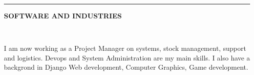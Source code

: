 \documentclass[10pt,A4]{article}
\newcommand{\cvsection}[2] {
\textcolor{titletext}{\uppercase{\textbf{#1}}}
}
\newcommand{\cvsect}[4]{
	\textcolor{#3}{\hrule}
	\colorbox{#3}{ {\cvsection{#1}{#4}}}
}
\begin{document}
\begin{minipage}{0.59\textwidth}
	
	
	
	
	
	
	

	\cvsect{Software and Industries}{0.49}{thirdcol}{textcol}\\[-15pt]
	\begin{center}
	\mbox{
		}
	\vspace{5pt}
	\hspace{10pt}
	\parbox[b][50pt][c]{0.9\textwidth}{
		\begin{center}
		\textcolor{textcol}{\newline \newline \newline {} \hspace{1pt} I am now working as a Project Manager on systems, stock management, support and logistics.\newline \faTerminal \hspace{1pt} Devops and System Administration are my main skills.\newline {} \hspace{1pt} I also have a backgrond in Django Web development, Computer Graphics, Game development.}
		\end{center}
			}
		

\end{center}
\end{minipage}
\end{document}
